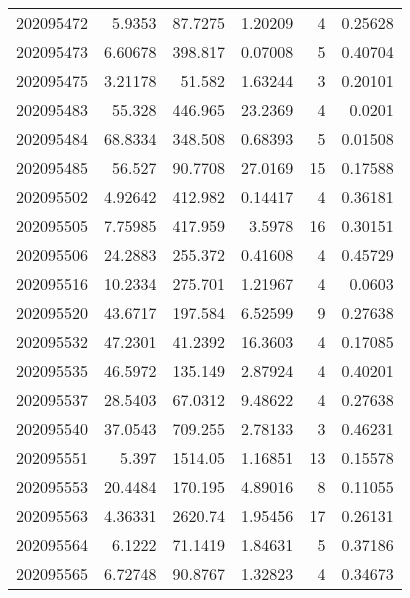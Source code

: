 \begin{tabular}{rrrrrr}
 202095472 &          5.9353  &       87.7275 &            1.20209 &           4 & 0.25628 \\
 202095473 &          6.60678 &      398.817  &            0.07008 &           5 & 0.40704 \\
 202095475 &          3.21178 &       51.582  &            1.63244 &           3 & 0.20101 \\
 202095483 &         55.328   &      446.965  &           23.2369  &           4 & 0.0201  \\
 202095484 &         68.8334  &      348.508  &            0.68393 &           5 & 0.01508 \\
 202095485 &         56.527   &       90.7708 &           27.0169  &          15 & 0.17588 \\
 202095502 &          4.92642 &      412.982  &            0.14417 &           4 & 0.36181 \\
 202095505 &          7.75985 &      417.959  &            3.5978  &          16 & 0.30151 \\
 202095506 &         24.2883  &      255.372  &            0.41608 &           4 & 0.45729 \\
 202095516 &         10.2334  &      275.701  &            1.21967 &           4 & 0.0603  \\
 202095520 &         43.6717  &      197.584  &            6.52599 &           9 & 0.27638 \\
 202095532 &         47.2301  &       41.2392 &           16.3603  &           4 & 0.17085 \\
 202095535 &         46.5972  &      135.149  &            2.87924 &           4 & 0.40201 \\
 202095537 &         28.5403  &       67.0312 &            9.48622 &           4 & 0.27638 \\
 202095540 &         37.0543  &      709.255  &            2.78133 &           3 & 0.46231 \\
 202095551 &          5.397   &     1514.05   &            1.16851 &          13 & 0.15578 \\
 202095553 &         20.4484  &      170.195  &            4.89016 &           8 & 0.11055 \\
 202095563 &          4.36331 &     2620.74   &            1.95456 &          17 & 0.26131 \\
 202095564 &          6.1222  &       71.1419 &            1.84631 &           5 & 0.37186 \\
 202095565 &          6.72748 &       90.8767 &            1.32823 &           4 & 0.34673 \\

\end{tabular}

